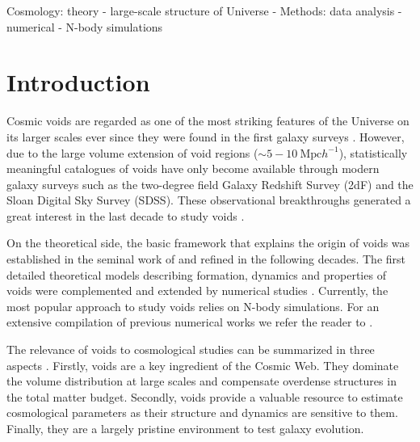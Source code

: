 \documentclass[a4,useAMS,usenatbib,usegraphicx]{mn2e}
\begin{document}
\begin{keywords}
Cosmology: theory - large-scale structure of Universe -
Methods: data analysis - numerical - N-body simulations
\end{keywords}



\section{Introduction}
\label{sec:introduction}

Cosmic voids are regarded as one of the most striking features of the
Universe on its larger scales ever since they were found in the first
galaxy surveys \citep{Chincarini75, Gregory78, Einasto80M, Einasto80N,
  Kirshner81, Zeldovich82,Kirshner87}.  
However, due to the large volume extension of void regions ($\sim
5-10\ \mbox{Mpc}  h^{-1}$), statistically meaningful catalogues of
voids \citep{Pan10,  Sutter12b, Nadathur14} have only become available
through modern galaxy surveys such as the two-degree field Galaxy
Redshift Survey (2dF) \citep{ Colless01, Colless03} and the Sloan
Digital Sky Survey (SDSS)\citep{York00, Abazajian03}.
These observational breakthroughs generated a great interest in the last
decade to study voids \citep{Hoyle04, Croton04, Padilla05, Rojas05,
  Ceccarelli06, Patiri06a, Tikhonov06, Patiri06b,Tikhonov07,
  BendaBeckmann08, Foster09, Ceccarelli13, Paz13, Sutter14a}. 


On the theoretical side, the basic framework that explains
the origin of voids was established in the seminal work of
\citet{Zeldovich70} and refined in the following decades.  
The first detailed theoretical models describing formation, dynamics
and properties of  voids \citep{Hoffman82, Icke84, Bertschinger85,
  Blumenthal92} were  complemented and extended by numerical studies
\citep{Martel90, Regos91, Weygaert93, Dubinski93, Bond96}. 
Currently, the most popular approach to study voids relies on N-body
simulations. For an extensive compilation of previous  
numerical works we refer the reader to \citet{Colberg08}.


The relevance of voids to cosmological studies can be summarized in
three aspects \citep{Platen07}. 
Firstly, voids are a key ingredient of the Cosmic Web. 
They dominate the volume distribution at large scales and
compensate overdense structures in the total matter
budget. 
Secondly, voids provide a valuable resource to estimate  
cosmological parameters as their structure and dynamics are sensitive
to them. 
Finally, they are a largely pristine environment to test galaxy
evolution. 
\end{document}
